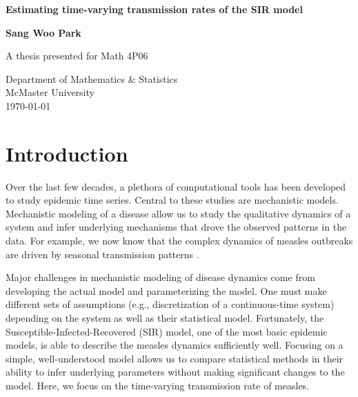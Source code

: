 \documentclass{article}
\begin{document}
\begin{titlepage}
   \begin{center}
       \vspace*{1cm}
 
       \textbf{Estimating time-varying transmission rates of the SIR model}
 
       \vspace{1.5cm}
 
       \textbf{Sang Woo Park}
 
       \vfill
 
       A thesis presented for Math 4P06\\
 
       \vspace{0.8cm}
 
       Department of Mathematics \& Statistics\\
       McMaster University\\
       \today
 
   \end{center}
\end{titlepage}
\pagebreak

\tableofcontents

\pagebreak

\section{Introduction}

Over the last few decades, a plethora of computational tools has been developed to study epidemic time series.
Central to these studies are mechanistic models.
Mechanistic modeling of a disease allow us to study the qualitative dynamics of a system and infer underlying mechanisms that drove the observed patterns in the data.
For example, we now know that the complex dynamics of measles outbreaks are driven by seasonal transmission patterns \citep{earn2000simple, dalziel2016persistent}.

Major challenges in mechanistic modeling of disease dynamics come from developing the actual model and parameterizing the model.
One must make different sets of assumptions (e.g., discretization of a continuous-time system) depending on the system as well as their statistical model.
Fortunately, the Susceptible-Infected-Recovered (SIR) model, one of the most basic epidemic models, is able to describe the measles dynamics sufficiently well.
Focusing on a simple, well-understood model allows us to compare statistical methods in their ability to infer underlying parameters without making significant changes to the model.
Here, we focus on the time-varying transmission rate of measles.
\end{document}
